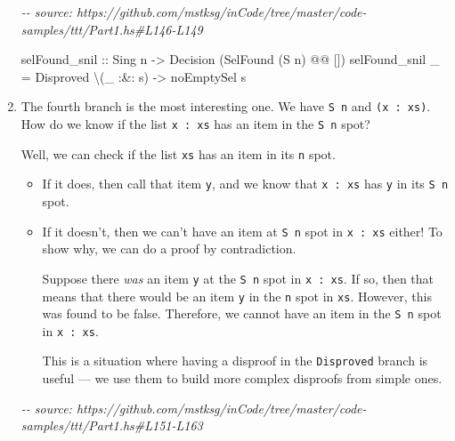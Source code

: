 \documentclass[]{article}
\newenvironment{Shaded}{}{}
\newcommand{\CommentTok}[1]{\textcolor[rgb]{0.38,0.63,0.69}{\textit{#1}}}
\newcommand{\DataTypeTok}[1]{\textcolor[rgb]{0.56,0.13,0.00}{#1}}
\newcommand{\NormalTok}[1]{#1}
\newcommand{\OperatorTok}[1]{\textcolor[rgb]{0.40,0.40,0.40}{#1}}
\newcommand{\OtherTok}[1]{\textcolor[rgb]{0.00,0.44,0.13}{#1}}
\begin{document}
\begin{enumerate}
\begin{Shaded}
\begin{Highlighting}[]
\CommentTok{{-}{-} source: https://github.com/mstksg/inCode/tree/master/code{-}samples/ttt/Part1.hs\#L146{-}L149}

\NormalTok{selFound\_snil}
\OtherTok{    ::} \DataTypeTok{Sing}\NormalTok{ n}
    \OtherTok{{-}>} \DataTypeTok{Decision}\NormalTok{ (}\DataTypeTok{SelFound}\NormalTok{ (}\DataTypeTok{\textquotesingle{}S}\NormalTok{ n) }\OperatorTok{@@}\NormalTok{ \textquotesingle{}[])}
\NormalTok{selFound\_snil \_ }\OtherTok{=} \DataTypeTok{Disproved}\NormalTok{ \textbackslash{}(\_ }\OperatorTok{:\&:}\NormalTok{ s) }\OtherTok{{-}>}\NormalTok{ noEmptySel s}
\end{Highlighting}
\end{Shaded}
\item
  The fourth branch is the most interesting one. We have
  \texttt{\textquotesingle{}S\ n} and \texttt{(x\ \textquotesingle{}:\ xs)}. How
  do we know if the list \texttt{x\ \textquotesingle{}:\ xs} has an item in the
  \texttt{\textquotesingle{}S\ n} spot?

  Well, we can check if the list \texttt{xs} has an item in its \texttt{n} spot.

  \begin{itemize}
  \item
    If it does, then call that item \texttt{y}, and we know that
    \texttt{x\ \textquotesingle{}:\ xs} has \texttt{y} in its
    \texttt{\textquotesingle{}S\ n} spot.
  \item
    If it doesn't, then we can't have an item at \texttt{\textquotesingle{}S\ n}
    spot in \texttt{x\ \textquotesingle{}:\ xs} either! To show why, we can do a
    proof by contradiction.

    Suppose there \emph{was} an item \texttt{y} at the
    \texttt{\textquotesingle{}S\ n} spot in \texttt{x\ \textquotesingle{}:\ xs}.
    If so, then that means that there would be an item \texttt{y} in the
    \texttt{n} spot in \texttt{xs}. However, this was found to be false.
    Therefore, we cannot have an item in the \texttt{\textquotesingle{}S\ n}
    spot in \texttt{x\ \textquotesingle{}:\ xs}.

    This is a situation where having a disproof in the \texttt{Disproved} branch
    is useful --- we use them to build more complex disproofs from simple ones.
  \end{itemize}

\begin{Shaded}
\begin{Highlighting}[]
\CommentTok{{-}{-} source: https://github.com/mstksg/inCode/tree/master/code{-}samples/ttt/Part1.hs\#L151{-}L163}


\end{Highlighting}
\end{Shaded}
\end{enumerate}
\end{document}
